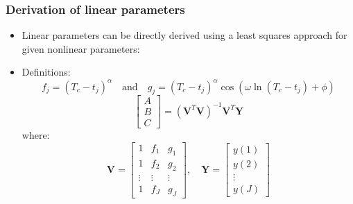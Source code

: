 \documentclass{beamer}
\begin{document}
\begin{frame}
\frametitle{Derivation of linear parameters}
\begin{itemize}
    \item Linear parameters can be directly derived using a least squares approach for given nonlinear parameters:
    \item Definitions:
    \[
    f_j = (T_c - t_j)^{\alpha}
    \quad \text{and} \quad
    g_j = (T_c - t_j)^{\alpha} \cos \left( \omega \ln(T_c - t_j) + \phi \right)
    \]
    \[
    \begin{bmatrix}
    A \\
    B \\
    C
    \end{bmatrix}
    =
    \left( \mathbf{V}^T \mathbf{V} \right)^{-1} \mathbf{V}^T \mathbf{Y}
    \]
    where:
    \[
    \mathbf{V} =
    \begin{bmatrix}
    1 & f_1 & g_1 \\
    1 & f_2 & g_2 \\
    \vdots & \vdots & \vdots \\
    1 & f_J & g_J
    \end{bmatrix},
    \quad
    \mathbf{Y} =
    \begin{bmatrix}
    y(1) \\
    y(2) \\
    \vdots \\
    y(J)
    \end{bmatrix}
    \]
\end{itemize}
\end{frame}

\end{document}
